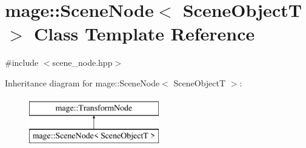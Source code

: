 \hypertarget{classmage_1_1_scene_node}{}\section{mage\+:\+:Scene\+Node$<$ Scene\+ObjectT $>$ Class Template Reference}
\label{classmage_1_1_scene_node}


{\ttfamily \#include $<$scene\+\_\+node.\+hpp$>$}

Inheritance diagram for mage\+:\+:Scene\+Node$<$ Scene\+ObjectT $>$\+:\begin{figure}[H]
\begin{center}
\leavevmode
\includegraphics[height=2.000000cm]{classmage_1_1_scene_node}
\end{center}
\end{figure}
